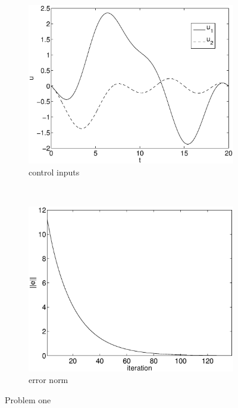 \begin{figure}
\begin{subfigure}[b]{0.45\textwidth}
\centering
\includegraphics[width=\textwidth]{img/manip_task_u.eps}
\caption{control inputs}
\end{subfigure}
~
\begin{subfigure}[b]{0.45\textwidth}
\centering
\includegraphics[width=\textwidth]{img/manip_task_err.eps}
\caption{error norm}
\end{subfigure}
\caption{Problem one}
\label{fig:pr1}
\end{figure}


